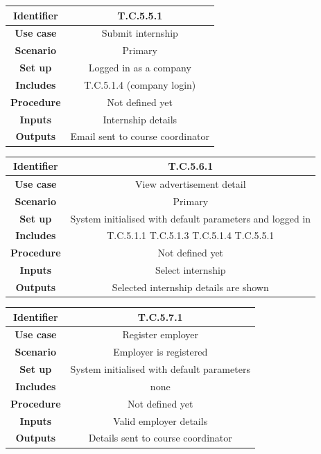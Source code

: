 \documentclass{l3deliverable}
\begin{document}
\begin{tabular}{|c|c|}
\hline \textbf{Identifier} & T.C.5.5.1\\
\hline \textbf{Use case} & Submit internship\\
\hline \textbf{Scenario} & Primary\\
\hline \textbf{Set up} & Logged in as a company\\
\hline \textbf{Includes} & T.C.5.1.4 (company login)\\
\hline \textbf{Procedure} & Not defined yet\\
\hline \textbf{Inputs} & Internship details\\
\hline \textbf{Outputs} & Email sent to course coordinator\\
\hline
\end{tabular}

\begin{tabular}{|c|c|}
\hline \textbf{Identifier} & T.C.5.6.1\\
\hline \textbf{Use case} & View advertisement detail\\
\hline \textbf{Scenario} & Primary\\
\hline \textbf{Set up} & System initialised with default parameters and logged in\\
\hline \textbf{Includes} & T.C.5.1.1 T.C.5.1.3 T.C.5.1.4 T.C.5.5.1\\
\hline \textbf{Procedure} & Not defined yet\\
\hline \textbf{Inputs} & Select internship\\
\hline \textbf{Outputs} & Selected internship details are shown\\
\hline
\end{tabular}

\begin{tabular}{|c|c|}
\hline \textbf{Identifier} & T.C.5.7.1\\
\hline \textbf{Use case} & Register employer\\
\hline \textbf{Scenario} & Employer is registered\\
\hline \textbf{Set up} & System initialised with default parameters\\
\hline \textbf{Includes} & none\\
\hline \textbf{Procedure} & Not defined yet\\
\hline \textbf{Inputs} & Valid employer details\\
\hline \textbf{Outputs} & Details sent to course coordinator\\
\hline
\end{tabular}
\end{document}
